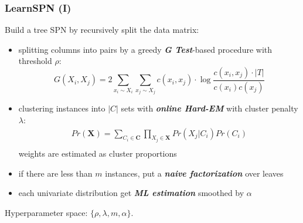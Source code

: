 \documentclass[10pt, t, xcolor={usenames,dvipsnames,svgnames}, compress]{beamer}
\begin{document}
\begin{frame}[t]
  \frametitle{LearnSPN (I)}
  Build a tree SPN by recursively split the data matrix:

  \begin{itemize}
  \item splitting columns into pairs by a greedy \textbf{\emph{G Test}}-based
    procedure with threshold $\rho$:
    \[
      G(X_i, X_j) =  2\sum_{x_i \sim X_i}\sum_{x_j \sim X_j}c(x_i, x_j)\cdot \log\frac{c(x_i, x_j)\cdot |T|}{c(x_i)c(x_j)}
    \]
  \item clustering instances into $|C|$ sets with \textbf{\emph{online Hard-EM}} with cluster penalty
    $\lambda$:
    \[\begin{array}{cc}
        Pr(\mathbf{X})= \sum_{C_i \in \mathbf{C}}\prod_{X_j \in \mathbf{X}}Pr(X_j|C_i)Pr(C_i)\\
      \end{array}\]
    weights are estimated as cluster proportions
  \item if there are less than $m$ instances, put a \textbf{\emph{naive
        factorization}} over leaves
  \item each univariate distribution get \emph{\textbf{ML estimation}} smoothed by $\alpha$  
  \end{itemize}\par\bigskip

  Hyperparameter space: $\{\rho, \lambda, m, \alpha\}$.
\end{frame}
\end{document}
